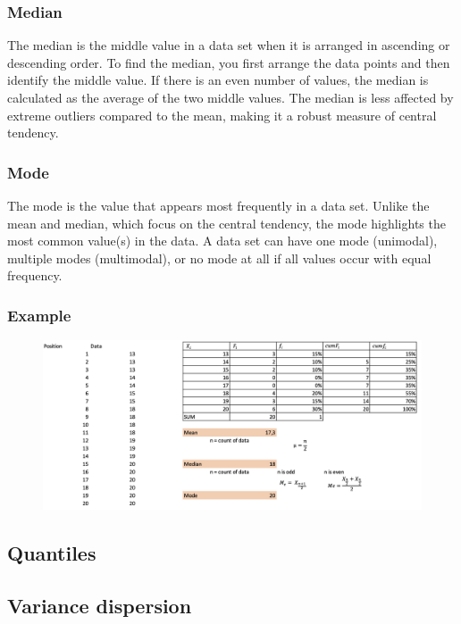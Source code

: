 \documentclass[a4paper,10pt,onecolumn]{article}
\begin{document}
\subsubsection{Median}
The median is the middle value in a data set when it is arranged in ascending or descending order. To find the median, you first arrange the data points and then identify the middle value. If there is an even number of values, the median is calculated as the average of the two middle values. The median is less affected by extreme outliers compared to the mean, making it a robust measure of central tendency.
\subsubsection{Mode}
The mode is the value that appears most frequently in a data set. Unlike the mean and median, which focus on the central tendency, the mode highlights the most common value(s) in the data. A data set can have one mode (unimodal), multiple modes (multimodal), or no mode at all if all values occur with equal frequency.
\\
\subsubsection{Example}
\begin{figure}[h]
    \centering
    \includegraphics[width=\textwidth]{mmm.png}    
\end{figure}
\subsection{Quantiles}
\subsection{Variance dispersion}


  
\end{document}
